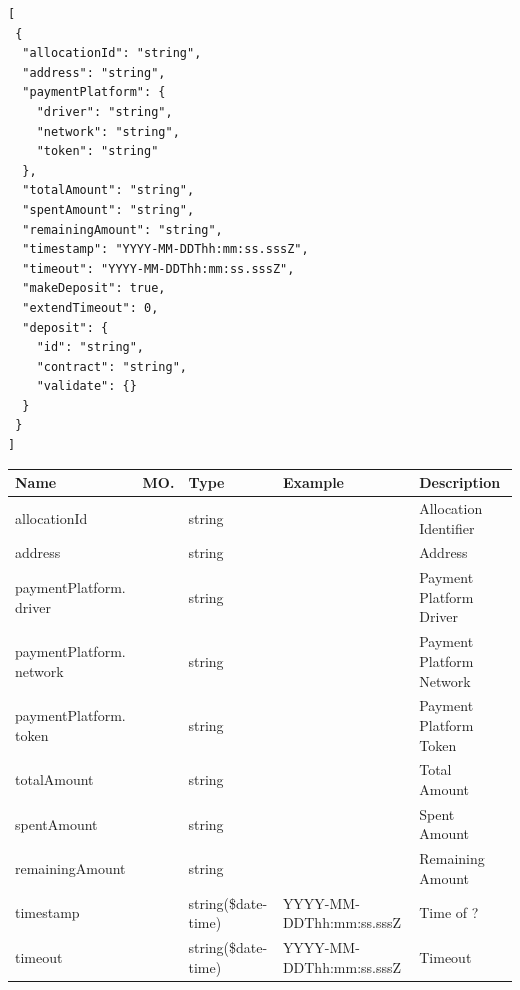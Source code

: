 \begin{enumerate}
\begin{tcolorbox}[boxrule=0pt, frame empty]
\begin{verbatim}
[
 {
  "allocationId": "string",
  "address": "string",
  "paymentPlatform": {
    "driver": "string",
    "network": "string",
    "token": "string"
  },
  "totalAmount": "string",
  "spentAmount": "string",
  "remainingAmount": "string",
  "timestamp": "YYYY-MM-DDThh:mm:ss.sssZ",
  "timeout": "YYYY-MM-DDThh:mm:ss.sssZ",
  "makeDeposit": true,
  "extendTimeout": 0,
  "deposit": {
    "id": "string",
    "contract": "string",
    "validate": {}
  }
 }
]

\end{verbatim}
\end{tcolorbox}

\begin{table}[H]
\footnotesize

\begin{center}
\begin{tabular}{|p{3cm}|l|p{3cm}|p{3cm}|p{4cm}|} 
\hline
\rowcolor{lightgray}	Name	& MO.	& Type	& Example & 	Description \\
\hline

allocationId				&	&	string				&								&	Allocation Identifier \\
\hline   

address						&	&	string				&								&	Address	 \\
\hline   
  
paymentPlatform. driver		&	&	string				&								&	Payment Platform Driver \\
\hline   

paymentPlatform. network	&	&	string				&								&	Payment Platform Network \\
\hline   
  
paymentPlatform. token		&	&	string				&								&	Payment Platform Token \\
\hline
     
totalAmount					&	&	string				&								&	Total Amount \\
\hline

spentAmount					&	&	string				&								&	Spent Amount \\
\hline

remainingAmount				&	&	string				&								&	Remaining Amount \\
\hline

timestamp					&   &	string(\$date-time)	&	YYYY-MM-DDThh:mm:ss.sssZ	&	Time of ? \\
\hline

timeout						& 	& 	string(\$date-time)	&	YYYY-MM-DDThh:mm:ss.sssZ	&	Timeout \\ 
\hline


\end{tabular}
\end{center}
\end{table}
\end{enumerate}
